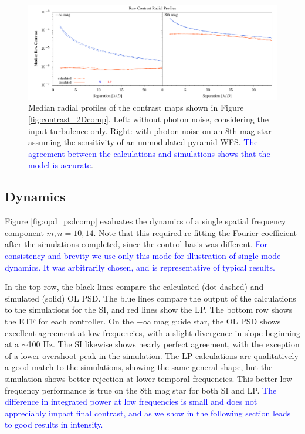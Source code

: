 \documentclass[10pt,preprint]{aastex631}
\newcommand{\jrmadd}[1]{\textcolor{blue}{#1}}
\begin{document}
\begin{figure}
\hspace{-0.3in}
\includegraphics[width=6.5in]{contrastRP.pdf}
\caption{Median radial profiles of the contrast maps shown in Figure \ref{fig:contrast_2Dcomp}.  Left: without photon noise, considering the input turbulence only.  Right: with photon noise on an 8th-mag star assuming the sensitivity of an unmodulated pyramid WFS. \jrmadd{The agreement between the calculations and simulations shows that the model is accurate}. \label{fig:contrast_radprof}}
\end{figure}

\subsection{Dynamics}
Figure \ref{fig:opd_psdcomp} evaluates the dynamics of a single spatial frequency component  $m,n = 10,14$.  Note that this required re-fitting the Fourier coefficient after the simulations completed, since the control basis was different.  \jrmadd{For consistency and brevity we use only this mode for illustration of single-mode dynamics.  It was arbitrarily chosen, and is representative of typical results.}

In the top row, the black lines compare the calculated (dot-dashed) and simulated (solid) OL PSD.  The blue lines compare the output of the calculations to the simulations for the SI, and red lines show the LP.  The bottom row shows the ETF for each controller.  On the $-\infty$ mag guide star, the OL PSD shows excellent agreement at low frequencies, with a slight divergence in slope beginning at a $\sim$100 Hz. The SI likewise shows nearly perfect agreement, with the exception of a lower overshoot peak in the simulation.  The LP calculations are qualitatively a good match to the simulations, showing the same general shape, but the simulation shows better rejection at lower temporal frequencies.  This better low-frequency performance is true on the 8th mag star for both SI and LP.  \jrmadd{The difference in integrated power at low frequencies is small and does not appreciably impact final contrast, and as we show in the following section leads to good results in intensity.}  
\end{document}
